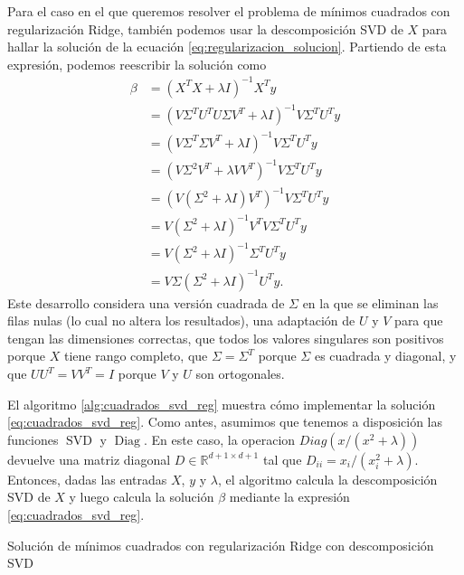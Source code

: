 \documentclass{article}
\begin{document}
Para el caso en el que queremos resolver el problema de mínimos cuadrados con regularización Ridge, también podemos usar la descomposición SVD de $X$ para hallar la solución de la ecuación \ref{eq:regularizacion_solucion}. Partiendo de esta expresión, podemos reescribir la solución como
%
\begin{equation} \label{eq:cuadrados_svd_reg}
    \begin{split}
        \beta &= (X^T X + \lambda I)^{-1} X^T y \\
            &= (V \Sigma^T U^T U \Sigma V^T + \lambda I)^{-1} V \Sigma^T U^T y \\
            &= (V \Sigma^T \Sigma V^T + \lambda I)^{-1} V \Sigma^T U^T y \\
            &= (V \Sigma^2 V^T + \lambda V V^T)^{-1} V \Sigma^T U^T y \\
            &= (V (\Sigma^2 + \lambda I) V^T)^{-1} V \Sigma^T U^T y \\
            &= V (\Sigma^2 + \lambda I)^{-1} V^T V \Sigma^T U^T y \\
            &= V (\Sigma^2 + \lambda I)^{-1} \Sigma^T U^T y \\
            &= V \Sigma (\Sigma^2 + \lambda I)^{-1}  U^T y.
    \end{split}
\end{equation}
%
Este desarrollo considera una versión cuadrada de $\Sigma$ en la que se eliminan las filas nulas (lo cual no altera los resultados), una adaptación de $U$ y $V$ para que tengan las dimensiones correctas, que todos los valores singulares son positivos porque $X$ tiene rango completo, que $\Sigma = \Sigma^T$ porque $\Sigma$ es cuadrada y diagonal, y que $U U^T = V V^T = I$ porque $V$ y $U$ son ortogonales.

El algoritmo \ref{alg:cuadrados_svd_reg} muestra cómo implementar la solución \ref{eq:cuadrados_svd_reg}. Como antes, asumimos que tenemos a disposición las funciones $\operatorname{SVD}$ y $\operatorname{Diag}$. En este caso, la operacion $Diag(x/(x^2 + \lambda))$ devuelve una matriz diagonal $D \in \mathbb{R}^{d+1 \times d+1}$ tal que $D_{ii} = x_i / (x_i^2 + \lambda)$. Entonces, dadas las entradas $X$, $y$ y $\lambda$, el algoritmo calcula la descomposición SVD de $X$ y luego calcula la solución $\beta$ mediante la expresión \ref{eq:cuadrados_svd_reg}. 

\begin{algorithm}[!ht]
    \caption{
        Solución de mínimos cuadrados con regularización Ridge con descomposición SVD
    } 
    \label{alg:cuadrados_svd_reg}
    \begin{algorithmic}
     
    \end{algorithmic}
\end{algorithm}
\end{document}
